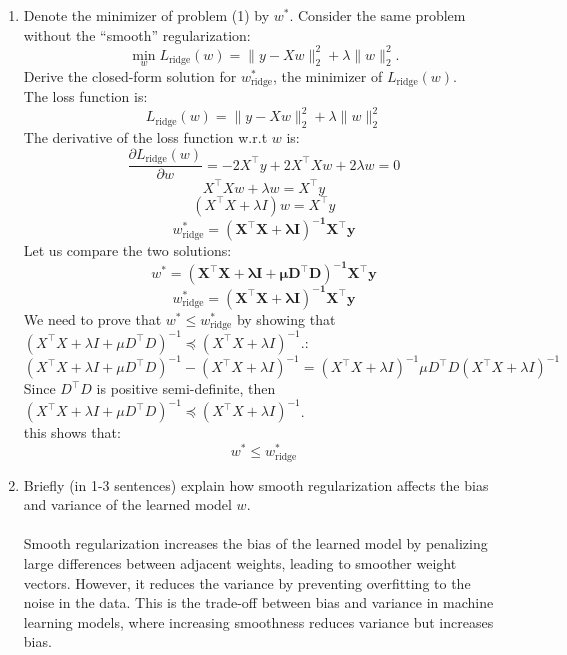 \documentclass[a3paper,12pt]{extarticle} %
\begin{document}
\begin{enumerate}
\begin{enumerate}
        \item Denote the minimizer of problem (1) by \( w^* \). Consider the same problem without the “smooth” regularization:
        \[
        \min_w L_{\text{ridge}}(w) = \|y - Xw\|_2^2 + \lambda \|w\|_2^2.
        \]
        Derive the closed-form solution for \( w_{\text{ridge}}^* \), the minimizer of \( L_{\text{ridge}}(w) \).
        \\ The loss function is:
        \[
        L_{\text{ridge}}(w) = \|y - Xw\|_2^2 + \lambda \|w\|_2^2
        \]
        The derivative of the loss function w.r.t \(w\) is:
        \[
        \frac{\partial L_{\text{ridge}}(w)}{\partial w} = -2X^\top y + 2X^\top Xw + 2\lambda w = 0
        \]
        \[
        X^\top Xw + \lambda w = X^\top y
        \]
        \[
        (X^\top X + \lambda I)w = X^\top y
        \]
        \[
        w_{\text{ridge}}^* = \mathbf{(X^\top X + \lambda I)^{-1} X^\top y}
        \]
        Let us compare the two solutions:   
        \[
        w^* =  \mathbf{(X^\top X + \lambda I + \mu D^\top D)^{-1} X^\top y}
        \]
        \[
        w_{\text{ridge}}^* = \mathbf{(X^\top X + \lambda I)^{-1} X^\top y}
        \]
        We need to prove that \(w^* \leq  w_{\text{ridge}}^*\) by showing that \((X^\top X + \lambda I + \mu D^\top D)^{-1} \preceq (X^\top X + \lambda I)^{-1}\).:
        \[
        (X^\top X + \lambda I + \mu D^\top D)^{-1} - (X^\top X + \lambda I)^{-1} = (X^\top X + \lambda I)^{-1} \mu D^\top D (X^\top X + \lambda I)^{-1}
        \]
        Since \(D^\top D\) is positive semi-definite, then \((X^\top X + \lambda I + \mu D^\top D)^{-1} \preceq (X^\top X + \lambda I)^{-1}\).
        \\ this shows that:
        \[
        w^* \leq  w_{\text{ridge}}^*
        \]
        \item Briefly (in 1-3 sentences) explain how smooth regularization affects the bias and variance of the learned model \( w \).
        \\
       \\  Smooth regularization increases the bias of the learned model by penalizing large differences between adjacent weights, leading to smoother weight vectors. However, it reduces the variance by preventing overfitting to the noise in the data. This is the trade-off between bias and variance in machine learning models, where increasing smoothness reduces variance but increases bias.
    \end{enumerate}
\end{enumerate}
\newpage
\end{document}

